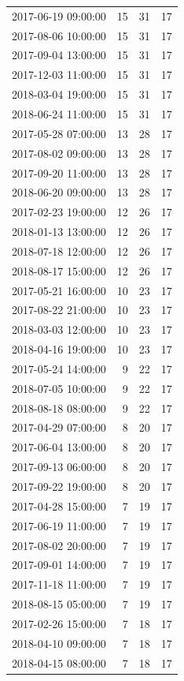 \begin{tabular}{lrrr}
2017-06-19 09:00:00 & 15 & 31 & 17 \\
2017-08-06 10:00:00 & 15 & 31 & 17 \\
2017-09-04 13:00:00 & 15 & 31 & 17 \\
2017-12-03 11:00:00 & 15 & 31 & 17 \\
2018-03-04 19:00:00 & 15 & 31 & 17 \\
2018-06-24 11:00:00 & 15 & 31 & 17 \\
2017-05-28 07:00:00 & 13 & 28 & 17 \\
2017-08-02 09:00:00 & 13 & 28 & 17 \\
2017-09-20 11:00:00 & 13 & 28 & 17 \\
2018-06-20 09:00:00 & 13 & 28 & 17 \\
2017-02-23 19:00:00 & 12 & 26 & 17 \\
2018-01-13 13:00:00 & 12 & 26 & 17 \\
2018-07-18 12:00:00 & 12 & 26 & 17 \\
2018-08-17 15:00:00 & 12 & 26 & 17 \\
2017-05-21 16:00:00 & 10 & 23 & 17 \\
2017-08-22 21:00:00 & 10 & 23 & 17 \\
2018-03-03 12:00:00 & 10 & 23 & 17 \\
2018-04-16 19:00:00 & 10 & 23 & 17 \\
2017-05-24 14:00:00 & 9 & 22 & 17 \\
2018-07-05 10:00:00 & 9 & 22 & 17 \\
2018-08-18 08:00:00 & 9 & 22 & 17 \\
2017-04-29 07:00:00 & 8 & 20 & 17 \\
2017-06-04 13:00:00 & 8 & 20 & 17 \\
2017-09-13 06:00:00 & 8 & 20 & 17 \\
2017-09-22 19:00:00 & 8 & 20 & 17 \\
2017-04-28 15:00:00 & 7 & 19 & 17 \\
2017-06-19 11:00:00 & 7 & 19 & 17 \\
2017-08-02 20:00:00 & 7 & 19 & 17 \\
2017-09-01 14:00:00 & 7 & 19 & 17 \\
2017-11-18 11:00:00 & 7 & 19 & 17 \\
2018-08-15 05:00:00 & 7 & 19 & 17 \\
2017-02-26 15:00:00 & 7 & 18 & 17 \\
2018-04-10 09:00:00 & 7 & 18 & 17 \\
2018-04-15 08:00:00 & 7 & 18 & 17 \\

\end{tabular}

